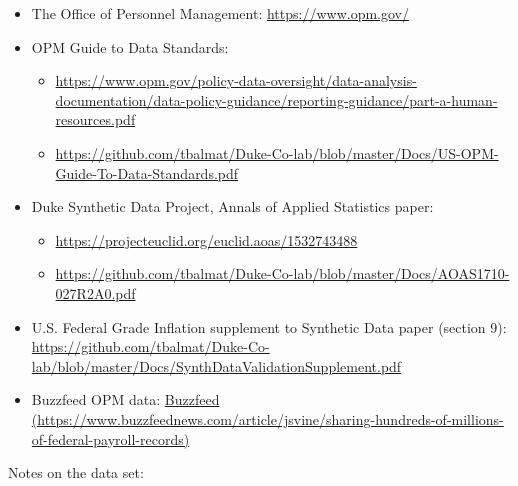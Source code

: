 \documentclass[10pt, letterpaper]{article}
\begin{document}
\begin{spacing}{1.0}
\begin{itemize}
  \item The Office of Personnel Management:  \url{https://www.opm.gov/}
  \item OPM Guide to Data Standards:
    \begin{itemize}
      \item \url{https://www.opm.gov/policy-data-oversight/data-analysis-documentation/data-policy-guidance/reporting-guidance/part-a-human-resources.pdf}
      \item \url{https://github.com/tbalmat/Duke-Co-lab/blob/master/Docs/US-OPM-Guide-To-Data-Standards.pdf}
    \end{itemize}
  \item Duke Synthetic Data Project, Annals of Applied Statistics paper:
    \begin{itemize}
      \item \url{https://projecteuclid.org/euclid.aoas/1532743488}
      \item \url{https://github.com/tbalmat/Duke-Co-lab/blob/master/Docs/AOAS1710-027R2A0.pdf}
    \end{itemize}
  \item U.S. Federal Grade Inflation supplement to Synthetic Data paper (section 9):  \url{https://github.com/tbalmat/Duke-Co-lab/blob/master/Docs/SynthDataValidationSupplement.pdf}
  \item Buzzfeed OPM data:  \url{Buzzfeed (https://www.buzzfeednews.com/article/jsvine/sharing-hundreds-of-millions-of-federal-payroll-records)}
\end{itemize}

Notes on the data set:


\end{spacing}
\end{document}
